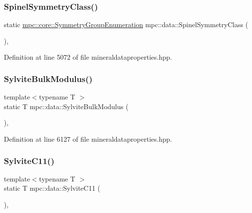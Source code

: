 \subsubsection{\texorpdfstring{Spinel\+Symmetry\+Class()}{SpinelSymmetryClass()}}
{\footnotesize\ttfamily static \mbox{\hyperlink{namespacempc_1_1core_a9d979684062547055a0ef5c13077bad8}{mpc\+::core\+::\+Symmetry\+Group\+Enumeration}} mpc\+::data\+::\+Spinel\+Symmetry\+Class (\begin{DoxyParamCaption}{ }\end{DoxyParamCaption})\hspace{0.3cm}{\ttfamily [inline]}, {\ttfamily [static]}}



Definition at line 5072 of file mineraldataproperties.\+hpp.

\mbox{\label{namespacempc_1_1data_a8773cc110ec7e99309a5970b4ddea457}} 
\subsubsection{\texorpdfstring{Sylvite\+Bulk\+Modulus()}{SylviteBulkModulus()}}
{\footnotesize\ttfamily template$<$typename T $>$ \\
static T mpc\+::data\+::\+Sylvite\+Bulk\+Modulus (\begin{DoxyParamCaption}{ }\end{DoxyParamCaption})\hspace{0.3cm}{\ttfamily [inline]}, {\ttfamily [static]}}



Definition at line 6127 of file mineraldataproperties.\+hpp.

\mbox{\label{namespacempc_1_1data_a9a03a8f274be78f02f9a7cf6c386018d}} 
\subsubsection{\texorpdfstring{Sylvite\+C11()}{SylviteC11()}}
{\footnotesize\ttfamily template$<$typename T $>$ \\
static T mpc\+::data\+::\+Sylvite\+C11 (\begin{DoxyParamCaption}{ }\end{DoxyParamCaption})\hspace{0.3cm}{\ttfamily [inline]}, {\ttfamily [static]}}



